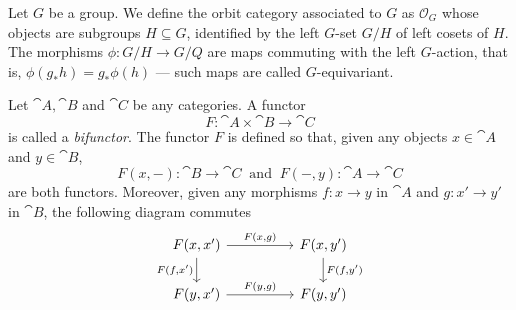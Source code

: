 \begin{example}
\label{exp:orbit-category}
Let \(G\) be a group. We define the orbit category associated to \(G\) as
\(\mathcal{O}_G\) whose objects are subgroups \(H \subseteq G\), identified by
the left \(G\)-set \(G/H\) of left cosets of \(H\). The morphisms \(\phi: G/H \to
G/Q\) are maps commuting with the left \(G\)-action, that is, \(\phi(g_{*}h) =
g_{*} \phi(h)\) --- such maps are called \(G\)-equivariant.
\end{example}

\begin{proposition}[Bifunctor]\label{def:bifunctor}
Let \(\cat A, \cat B\) and \(\cat C\) be any categories. A functor
\[
  F: \cat A \times \cat B \longrightarrow \cat C
\]
is called a \emph{bifunctor}. The functor \(F\) is defined so that, given any
objects \(x \in \cat A\) and \(y \in \cat B\),
\[
  F(x, -): \cat B \longrightarrow \cat C\ \text{ and }\
  F(-, y): \cat A \longrightarrow \cat C
\]
are both functors. Moreover, given any morphisms \(f: x \to y\) in \(\cat A\)
and \(g: x' \to y'\) in \(\cat B\), the following diagram commutes
\[
  \begin{tikzcd}
    F(x, x') \ar[rr, "F{(x, g)}"] \ar[d, swap, "F{(f, x')}"]
      & &F(x, y') \ar[d, "F{(f, y')}"] \\
    F(y, x') \ar[rr, "F{(y, g)}"]
      & &F(y, y')
  \end{tikzcd}
\]
\end{proposition}

